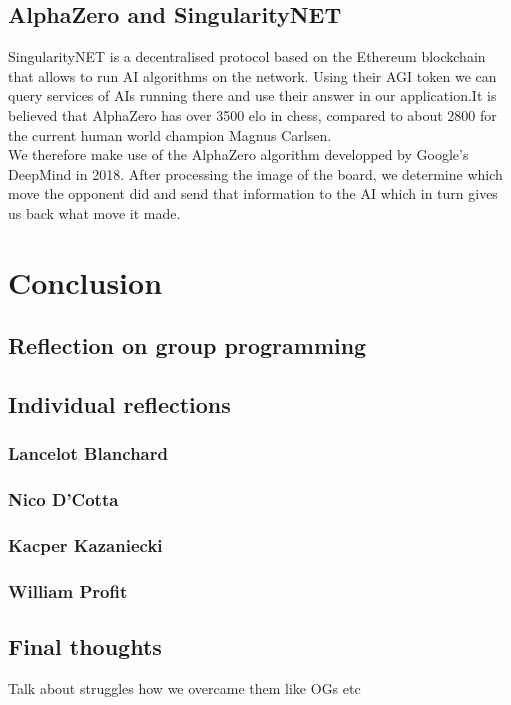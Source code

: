 \documentclass[11pt]{article}
\begin{document}
\subsection{AlphaZero and SingularityNET}

SingularityNET is a decentralised protocol based on the Ethereum blockchain that
allows to run AI algorithms on the network. Using their AGI token we can query
services of AIs running there and use their answer in our application.It is
believed that AlphaZero has over 3500 elo in chess, compared to about 2800 for
the current human world champion Magnus Carlsen.\\ We therefore make use of the
AlphaZero algorithm developped by Google's DeepMind in 2018. After processing
the image of the board, we determine which move the opponent did and send that
information to the AI which in turn gives us back what move it made.

\section{Conclusion}
\subsection{Reflection on group programming}
\subsection{Individual reflections}
\subsubsection{Lancelot Blanchard}
\subsubsection{Nico D'Cotta}
\subsubsection{Kacper Kazaniecki}
\subsubsection{William Profit}
\subsection{Final thoughts}
Talk about struggles how we overcame them like OGs etc
\end{document}
